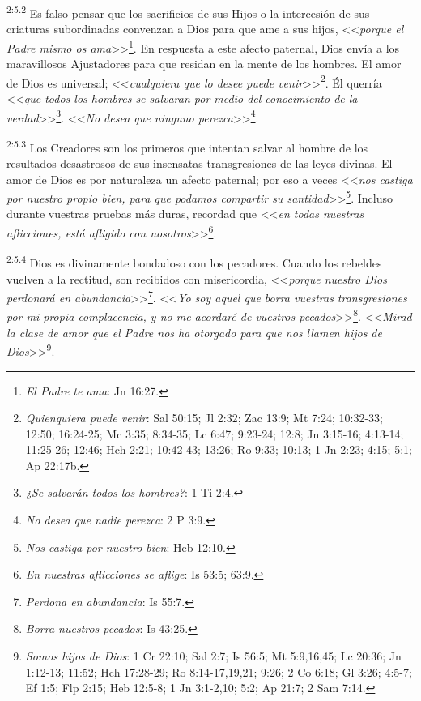 \par
\textsuperscript{2:5.2} Es falso pensar que los sacrificios de sus Hijos o la intercesión de sus criaturas subordinadas convenzan a Dios para que ame a sus hijos, <<\textit{porque el Padre mismo os ama}>>\footnote{\textit{El Padre te ama}: Jn 16:27.}. En respuesta a este afecto paternal, Dios envía a los maravillosos Ajustadores para que residan en la mente de los hombres. El amor de Dios es universal; <<\textit{cualquiera que lo desee puede venir}>>\footnote{\textit{Quienquiera puede venir}: Sal 50:15; Jl 2:32; Zac 13:9; Mt 7:24; 10:32-33; 12:50; 16:24-25; Mc 3:35; 8:34-35; Lc 6:47; 9:23-24; 12:8; Jn 3:15-16; 4:13-14; 11:25-26; 12:46; Hch 2:21; 10:42-43; 13:26; Ro 9:33; 10:13; 1 Jn 2:23; 4:15; 5:1; Ap 22:17b.}. Él querría <<\textit{que todos los hombres se salvaran por medio del conocimiento de la verdad}>>\footnote{\textit{¿Se salvarán todos los hombres?}: 1 Ti 2:4.}. <<\textit{No desea que ninguno perezca}>>\footnote{\textit{No desea que nadie perezca}: 2 P 3:9.}.

\par
\textsuperscript{2:5.3} Los Creadores son los primeros que intentan salvar al hombre de los resultados desastrosos de sus insensatas transgresiones de las leyes divinas. El amor de Dios es por naturaleza un afecto paternal; por eso a veces <<\textit{nos castiga por nuestro propio bien, para que podamos compartir su santidad}>>\footnote{\textit{Nos castiga por nuestro bien}: Heb 12:10.}. Incluso durante vuestras pruebas más duras, recordad que <<\textit{en todas nuestras aflicciones, está afligido con nosotros}>>\footnote{\textit{En nuestras aflicciones se aflige}: Is 53:5; 63:9.}.

\par
\textsuperscript{2:5.4} Dios es divinamente bondadoso con los pecadores. Cuando los rebeldes vuelven a la rectitud, son recibidos con misericordia, <<\textit{porque nuestro Dios perdonará en abundancia}>>\footnote{\textit{Perdona en abundancia}: Is 55:7.}. <<\textit{Yo soy aquel que borra vuestras transgresiones por mi propia complacencia, y no me acordaré de vuestros pecados}>>\footnote{\textit{Borra nuestros pecados}: Is 43:25.}. <<\textit{Mirad la clase de amor que el Padre nos ha otorgado para que nos llamen hijos de Dios}>>\footnote{\textit{Somos hijos de Dios}: 1 Cr 22:10; Sal 2:7; Is 56:5; Mt 5:9,16,45; Lc 20:36; Jn 1:12-13; 11:52; Hch 17:28-29; Ro 8:14-17,19,21; 9:26; 2 Co 6:18; Gl 3:26; 4:5-7; Ef 1:5; Flp 2:15; Heb 12:5-8; 1 Jn 3:1-2,10; 5:2; Ap 21:7; 2 Sam 7:14.}.

